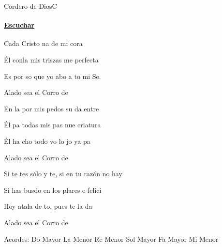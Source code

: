 \documentclass[12pt, spanish]{book}
\newcommand{\NotCCLIed}{\relax}
\begin{document}
    \begin{song}{Cordero de Dios}{C}
        {} %
        {}
        {} %
        {} %
        \ifChordBk
        \paragraph{\mbox{}\hfill\protect\href{https://open.spotify.com/intl-es/track/6OPwi7j7tbd668mqB9sNll}{Escuchar}\mbox{}\hfill}
        \fi


        \begin{SBOpGroup}
            Cada  Cristo na de  mi cora

            Él conla mis triszas me  perfecta 

            Es por so que yo abo a to mi Se.

            Alado sea el Corro de 
        \end{SBOpGroup}
        \vskip 20pt
        \begin{SBOpGroup}
            En la  por mis pedos su da entre

            Él pa todas mis pas nue criatura 

            Él ha cho todo vo lo jo ya pa

            Alado sea el Corro de 
        \end{SBOpGroup}
        \vskip 20pt
        \begin{SBOpGroup}
            Si te tes sólo y te, si en tu razón no hay 

            Si has busdo en los plares e felici

            Hoy atala de to, pues  te la da

            Alado sea el Corro de 
        \end{SBOpGroup}

        \ifChordBk
        \begin{SBOpGroup}
            Acordes:\break
            \upchord{\C}\qquad Do Mayor \hfill
            \upchord{\Am}\qquad La Menor \hfill\null\break
            \upchord{\Dm}\qquad Re Menor \hfill
            \upchord{\G}\qquad Sol Mayor \hfill\null\break
            \upchord{\F}\qquad Fa Mayor \hfill
            \upchord{\Em}\qquad Mi Menor \hfill\null\break
        \end{SBOpGroup}
        \fi
    \end{song}
\end{document}
